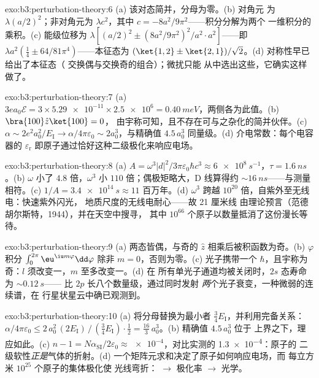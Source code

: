 \begin{solution}{exo:b3:perturbation-theory:6}
(a) 该对态简并，分母为零。(b) 对角元
为 $\lambda(a/2)^2$；非对角元为 $\lambda c^2$，其中 $c =
-8a^2/9\pi^2$——积分分解为两个
一维积分的乘积。(c) 能级位移为 $\lambda[(a/2)^2 \pm
(8a^2/9\pi^2)^2/a^2\cdot a^2]$——即 $\lambda a^2(\tfrac14 \pm
64/81\pi^4)$——本征态为 $(\ket{1,2} \pm \ket{2,1})/
\sqrt2$。(d) 对称性早已给出了本征态（
交换偶与交换奇的组合）；微扰只能
从中选出这些，它确实这样做了。
\end{solution}

\begin{solution}{exo:b3:perturbation-theory:7}
(a) $3ea_0\mathcal E = 3 \times \num{5.29e-11} \times \num{2.5e6}
= \qty{0.40}{meV}$，两侧各为此值。(b) $\bra{100}\hat z\ket{100} = 0$，
由宇称可知，且不存在可与之杂化的简并伙伴。(c)
$\alpha \sim 2e^2a_0^2/E_{\text{I}} \to \alpha/4\pi\varepsilon_0
\sim 2a_0^3$，与精确值 $4.5\,a_0^3$ 同量级。(d)
介电常数：每个电容器的 $\varepsilon_{\text{r}}$
即原子通过恰好这种二级极化来响应电场。
\end{solution}

\begin{solution}{exo:b3:perturbation-theory:8}
(a) $A = \omega^3|d|^2/3\pi\varepsilon_0\hbar c^3 \approx
\qty{6e8}{s^{-1}}$，$\tau = \qty{1.6}{ns}$。(b) $\omega$ 小了
$4.8$ 倍，$\omega^3$ 小 $110$ 倍；偶极矩略大，D
线算得约 $\sim\qty{16}{ns}$——与测量相符。(c)
$1/A = \qty{3.4e14}{s} \approx 11$ 百万年。(d) $\omega^3$
跨越 $10^{20}$ 倍，自紫外至无线电：快速紫外闪光，
地质尺度的无线电耐心——故 21 厘米线
由理论预言（范德胡尔斯特，1944），并在天空中搜寻，
其中 $10^{66}$ 个原子以数量抵消了这份漫长等待。
\end{solution}

\begin{solution}{exo:b3:perturbation-theory:9}
(a) 两态皆偶，与奇的 $\hat z$ 相乘后被积函数为奇。(b)
$\varphi$ 积分 $\int_0^{2\pi}\eu^{\iu m\varphi}\dd\varphi$
除非 $m = 0$，否则为零。(c) 光子携带一个 $\hbar$，且宇称为
奇：$l$ 须改变一，$m$ 至多改变一。(d) 在
所有单光子通道均被关闭时，$2s$ 态寿命为 $\sim\qty{0.12}{s}$——
比 $2p$ 长八个数量级，通过同时发射
\emph{两}个光子衰变，一种微弱的连续谱，在
行星状星云中确已观测到。
\end{solution}

\begin{solution}{exo:b3:perturbation-theory:10}
(a) 将分母替换为最小者 $\tfrac34
E_{\text{I}}$，并利用完备关系：$\alpha/4\pi\varepsilon_0 \le
2\,a_0^2\,(2E_{\text{I}})\,/\,(\tfrac34 E_{\text{I}})\cdot\tfrac12
= \tfrac{16}3\,a_0^3$。(b) 精确值 $4.5\,a_0^3$ 位于
上界之下，理应如此。(c) $n - 1 = N\alpha_{\text{SI}}/2\varepsilon_0
\approx \num{e-4}$，对比实测的 \num{1.3e-4}：原子的
二级软性\emph{正是}气体的折射。(d)
一个矩阵元求和决定了原子如何响应电场，而
每立方米 $10^{25}$ 个原子的集体极化使
光线弯折： $\to$ 极化率 $\to$ 光学。
\end{solution}

